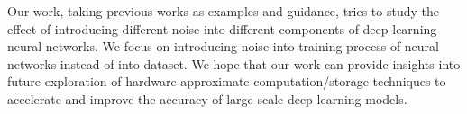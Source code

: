 Our work, taking previous works as examples and guidance, tries to
study the effect of introducing different noise into different
components of deep learning neural networks. We focus on introducing
noise into training process of neural networks instead of into dataset.
We hope that our work can provide insights into future exploration of
hardware approximate computation/storage techniques to accelerate and
improve the accuracy of large-scale deep learning models.

